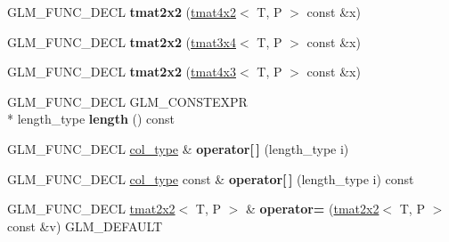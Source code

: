 \begin{DoxyCompactItemize}
\item 
\hypertarget{structglm_1_1tmat2x2_a470191296126147372f7ba04535e01fb}{G\-L\-M\-\_\-\-F\-U\-N\-C\-\_\-\-D\-E\-C\-L {\bfseries tmat2x2} (\hyperlink{structglm_1_1tmat4x2}{tmat4x2}$<$ T, P $>$ const \&x)}\label{structglm_1_1tmat2x2_a470191296126147372f7ba04535e01fb}

\item 
\hypertarget{structglm_1_1tmat2x2_abb5235dd0bc0f2aced04e5dcba22e040}{G\-L\-M\-\_\-\-F\-U\-N\-C\-\_\-\-D\-E\-C\-L {\bfseries tmat2x2} (\hyperlink{structglm_1_1tmat3x4}{tmat3x4}$<$ T, P $>$ const \&x)}\label{structglm_1_1tmat2x2_abb5235dd0bc0f2aced04e5dcba22e040}

\item 
\hypertarget{structglm_1_1tmat2x2_a66947436834c7b463eb5d08c5aa6ef19}{G\-L\-M\-\_\-\-F\-U\-N\-C\-\_\-\-D\-E\-C\-L {\bfseries tmat2x2} (\hyperlink{structglm_1_1tmat4x3}{tmat4x3}$<$ T, P $>$ const \&x)}\label{structglm_1_1tmat2x2_a66947436834c7b463eb5d08c5aa6ef19}

\item 
\hypertarget{structglm_1_1tmat2x2_a6e21e7ca2e586089ef739def9a5dd5e9}{G\-L\-M\-\_\-\-F\-U\-N\-C\-\_\-\-D\-E\-C\-L G\-L\-M\-\_\-\-C\-O\-N\-S\-T\-E\-X\-P\-R \\*
length\-\_\-type {\bfseries length} () const }\label{structglm_1_1tmat2x2_a6e21e7ca2e586089ef739def9a5dd5e9}

\item 
\hypertarget{structglm_1_1tmat2x2_ae9e51d1d6b2d5f3ed9e42da1945b7998}{G\-L\-M\-\_\-\-F\-U\-N\-C\-\_\-\-D\-E\-C\-L \hyperlink{structglm_1_1tvec2}{col\-\_\-type} \& {\bfseries operator\mbox{[}$\,$\mbox{]}} (length\-\_\-type i)}\label{structglm_1_1tmat2x2_ae9e51d1d6b2d5f3ed9e42da1945b7998}

\item 
\hypertarget{structglm_1_1tmat2x2_a50d3c00e93963e2db8b306a4d5922cf1}{G\-L\-M\-\_\-\-F\-U\-N\-C\-\_\-\-D\-E\-C\-L \hyperlink{structglm_1_1tvec2}{col\-\_\-type} const \& {\bfseries operator\mbox{[}$\,$\mbox{]}} (length\-\_\-type i) const }\label{structglm_1_1tmat2x2_a50d3c00e93963e2db8b306a4d5922cf1}

\item 
\hypertarget{structglm_1_1tmat2x2_a1ac298c5914990ffb37bb71d462648e5}{G\-L\-M\-\_\-\-F\-U\-N\-C\-\_\-\-D\-E\-C\-L \hyperlink{structglm_1_1tmat2x2}{tmat2x2}$<$ T, P $>$ \& {\bfseries operator=} (\hyperlink{structglm_1_1tmat2x2}{tmat2x2}$<$ T, P $>$ const \&v) G\-L\-M\-\_\-\-D\-E\-F\-A\-U\-L\-T}\label{structglm_1_1tmat2x2_a1ac298c5914990ffb37bb71d462648e5}


\end{DoxyCompactItemize}
